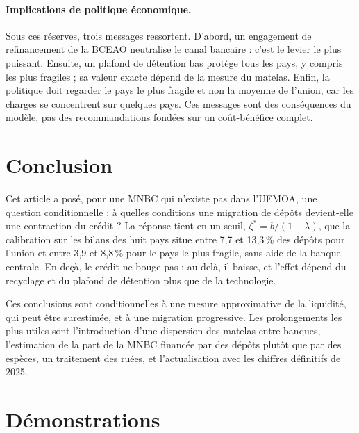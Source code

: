 \documentclass[11pt,a4paper]{article}
\newcommand{\zs}{\zeta^{*}}
\begin{document}
	\paragraph{Implications de politique économique.} Sous ces réserves, trois messages ressortent. D'abord, un engagement de refinancement de la BCEAO neutralise le canal bancaire : c'est le levier le plus puissant. Ensuite, un plafond de détention bas protège tous les pays, y compris les plus fragiles ; sa valeur exacte dépend de la mesure du matelas. Enfin, la politique doit regarder le pays le plus fragile et non la moyenne de l'union, car les charges se concentrent sur quelques pays. Ces messages sont des conséquences du modèle, pas des recommandations fondées sur un coût-bénéfice complet.
	
	\section{Conclusion}\label{sec:conclusion}
	
	Cet article a posé, pour une MNBC qui n'existe pas dans l'UEMOA, une question conditionnelle : à quelles conditions une migration de dépôts devient-elle une contraction du crédit ? La réponse tient en un seuil, $\zs=b/(1-\lambda)$, que la calibration sur les bilans des huit pays situe entre 7,7 et 13,3\,\% des dépôts pour l'union et entre 3,9 et 8,8\,\% pour le pays le plus fragile, sans aide de la banque centrale. En deçà, le crédit ne bouge pas ; au-delà, il baisse, et l'effet dépend du recyclage et du plafond de détention plus que de la technologie.
	
	Ces conclusions sont conditionnelles à une mesure approximative de la liquidité, qui peut être surestimée, et à une migration progressive. Les prolongements les plus utiles sont l'introduction d'une dispersion des matelas entre banques, l'estimation de la part de la MNBC financée par des dépôts plutôt que par des espèces, un traitement des ruées, et l'actualisation avec les chiffres définitifs de 2025.
	

\newpage
	\appendix
	\section{Démonstrations}\label{app:preuves}
	
\end{document}
